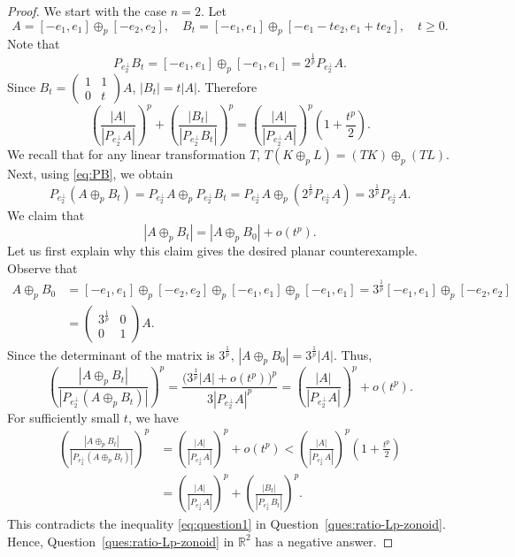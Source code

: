 \documentclass[11pt,a4paper]{amsart}
\theoremstyle{plain}
\theoremstyle{definition}
\newcommand{\R}{\mathbb R}
\begin{document}
    \begin{proof}
We start with the case $n=2$. Let 
    \[
     A = [-e_1,e_1] \oplus_p [-e_2,e_2], \quad B_t = [-e_1,e_1] \oplus_p [-e_1-te_2, e_1 + te_2], \quad   t  \geq 0.
    \]
    Note that 
    \begin{equation}
        \label{eq:PB}
        P_{e_2^\perp} B_t  = [-e_1,e_1] \oplus_p [-e_1,e_1] = 2^{\frac{1}{p}} P_{e_2^\perp} A. 
    \end{equation}
    Since $B_t = \begin{pmatrix}
            1&1\\
            0&t
        \end{pmatrix} A$,  $|B_t| = t |A|$. Therefore 
        \[
            \left(\frac{|A|}{\left|P_{e_2^{\perp}} A\right|}\right)^p+\left(\frac{|B_t|}{\left|P_{e_2^{\perp}} B_t\right|}\right)^p = \left(\frac{|A|}{\left|P_{e_2^{\perp}} A\right|}\right)^p \left( 1+ \frac{t^p}{2} \right).
        \]
    We recall that for any linear transformation $T$, $T(K \oplus_p L) =(TK) \oplus_p (TL)$. Next, using \eqref{eq:PB}, we obtain
    \[
        P_{e_2^{\perp}} (A \oplus_p B_t) = P_{e_2^{\perp}} A \oplus_p P_{e_2^{\perp}} B_t = P_{e_2^{\perp}} A \oplus_p (2^{\frac{1}{p}} P_{e_2^{\perp}} A) = 3^{\frac{1}{p}} P_{e_2^{\perp}} A.
    \]
    We claim that 
    \begin{equation} \label{eq:claim-lp-2}
        |A \oplus_p B_t| = |A \oplus_p B_0| + o(t^p).
    \end{equation}
    Let us first explain why this claim gives the desired planar counterexample. Observe that
    \begin{align}
        A \oplus_p B_0 &= [-e_1,e_1] \oplus_p [-e_2,e_2]\oplus_p [-e_1,e_1] \oplus_p [-e_1,e_1] = 3^{\frac{1}{p}}[-e_1,e_1] \oplus_p [-e_2,e_2]  
        \\
        &= \begin{pmatrix}
        3^{\frac{1}{p}}&0\\
        0&1
    \end{pmatrix} A.
    \end{align}
    Since the determinant of the matrix is $3^{\frac{1}{p}}$, $|A \oplus_p B_0| = 3^{\frac{1}{p}}|A|$. Thus,
    \[
        \left(\frac{\left|A \oplus_p B_t\right|}{\left|P_{e_2^{\perp}}\left(A \oplus_p B_t\right)\right|}\right)^p = \frac{\bigg(3^{\frac{1}{p}}|A| + o(t^p)\bigg)^p}{3|P_{e_2^{\perp}} A|^p} = \left(\frac{|A|}{\left|P_{e_2^{\perp}} A\right|}\right)^p + o(t^p).
    \]
    For sufficiently small $t$, we have
    \begin{align}
        \left( \frac{\left|A \oplus_p B_t\right|} {\left|P_{e_2^{\perp}}\left(A \oplus_p B_t\right)\right|} \right)^p 
        &=\left(\frac{|A|}{\left|P_{e_2^{\perp}} A\right|}\right)^p + o(t^p) < \left(\frac{|A|}{\left|P_{e_2^{\perp}} A\right|}\right)^p \left( 1+ \frac{t^p}{2} \right) 
        \\
        &=
        \left(\frac{|A|}{\left|P_{e_2^{\perp}} A\right|}\right)^p+\left(\frac{|B_t|}{\left|P_{e_2^{\perp}} B_t\right|}\right)^p.
    \end{align}
    This contradicts the inequality \eqref{eq:question1} in Question~\ref{ques:ratio-Lp-zonoid}. Hence, Question~\ref{ques:ratio-Lp-zonoid} in $\R^2$ has a negative answer. 


\end{proof}
\end{document}
